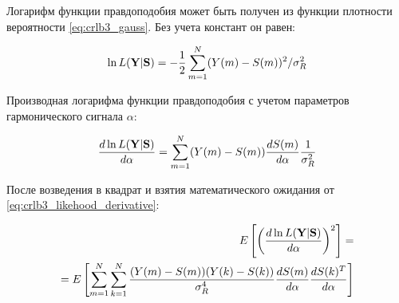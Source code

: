 Логарифм функции правдоподобия может быть получен из функции плотности вероятности \ref{eq:crlb3_gauss}. Без учета констант он равен:
\begin{center}
\begin{eqnarray}
	\label{eq:crlb3_likehood}
	\ln L({\bf Y}|{\bf S}) = -\frac{1}{2} \sum \limits_{m=1}^{N}(Y(m) - S(m))^2 / \sigma_R^2
\end{eqnarray}
\end{center}

Производная логарифма функции правдоподобия с учетом параметров гармонического сигнала ${\alpha}$:
\begin{center}
\begin{eqnarray}
	\label{eq:crlb3_likehood_derivative}
	\frac{d \ln L({\bf Y}|{\bf S})}{d {\bf \alpha}} = \sum \limits_{m=1}^{N}(Y(m) - S(m)) \frac{d S(m)}{d \alpha} \frac{1}{\sigma_R^2}
\end{eqnarray}
\end{center}

После возведения в квадрат и взятия математического ожидания от \ref{eq:crlb3_likehood_derivative}:
\begin{center}
\begin{eqnarray}
	E \left[ \left( \frac{d \ln L({\bf Y}|{\bf S})}{d {\bf \alpha}} \right)^2 \right]  =  \\
	 = E \left[ \sum \limits_{m=1}^{N}\sum \limits_{k=1}^{N} \frac{(Y(m) - S(m))(Y(k) - S(k))}{\sigma_R^4} \frac{d S(m)}{d \alpha} \frac{d S(k)^T}{d \alpha} \right]
\end{eqnarray}
\end{center}

